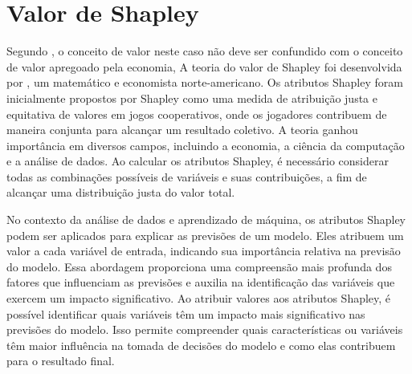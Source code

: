 \documentclass[12pt,oneside,a4paper,chapter=TITLE,
			   english,brazil]{abntex2}
\begin{document}



\vspace{\onelineskip}
\section{  Valor de Shapley }
\vspace{\onelineskip}
 Segundo , o conceito de valor neste caso não deve ser confundido com o conceito de valor apregoado pela economia,
A teoria do valor de Shapley foi desenvolvida por , um matemático e economista norte-americano.  Os atributos Shapley foram inicialmente propostos por Shapley como uma medida de atribuição justa e equitativa de valores em jogos cooperativos, onde os jogadores contribuem de maneira conjunta para alcançar um resultado coletivo. A teoria ganhou importância em diversos campos, incluindo a economia, a ciência da computação e a análise de dados.  Ao calcular os atributos Shapley, é necessário considerar todas as combinações possíveis de variáveis e suas contribuições, a fim de alcançar uma distribuição justa do valor total.

 No contexto da análise de dados e aprendizado de máquina, os atributos Shapley podem ser aplicados para explicar as previsões de um modelo. Eles atribuem um valor a cada variável de entrada, indicando sua importância relativa na previsão do modelo. Essa abordagem proporciona uma compreensão mais profunda dos fatores que influenciam as previsões e auxilia na identificação das variáveis que exercem um impacto significativo.  Ao atribuir valores aos atributos Shapley, é possível identificar quais variáveis têm um impacto mais significativo nas previsões do modelo. Isso permite compreender quais características ou variáveis têm maior influência na tomada de decisões do modelo e como elas contribuem para o resultado final.
\end{document}
